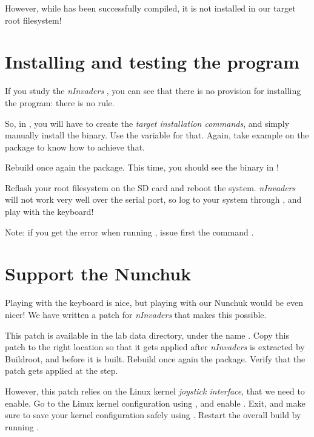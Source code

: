 However, while  has been successfully compiled, it is
not installed in our target root filesystem!

\section{Installing and testing the program}

If you study the {\em nInvaders} , you can see that
there is no provision for installing the program: there is no
 rule.

So, in , you will have to create the {\em target
  installation commands}, and simply manually install the
 binary. Use the  variable for
that. Again, take example on the  package to know how to
achieve that.

Rebuild once again the  package. This time, you should
see the  binary in !

Reflash your root filesystem on the SD card and reboot the
system. {\em nInvaders} will not work very well over the serial port,
so log to your system through , and play 
with the keyboard!

Note: if you get the error  when running , issue first the
command .

\section{Support the Nunchuk}

Playing with the keyboard is nice, but playing with our Nunchuk would
be even nicer! We have written a patch for {\em nInvaders} that makes
this possible.

This patch is available in the lab data directory, under the name
. Copy this patch to the right
location so that it gets applied after {\em nInvaders} is extracted by
Buildroot, and before it is built. Rebuild once again the
 package. Verify that the patch gets applied at the
 step.

However, this patch relies on the Linux kernel {\em joystick
  interface}, that we need to enable. Go to the Linux kernel
configuration using , and enable
. Exit, and make sure to save your kernel
configuration safely using . Restart
the overall build by running .

